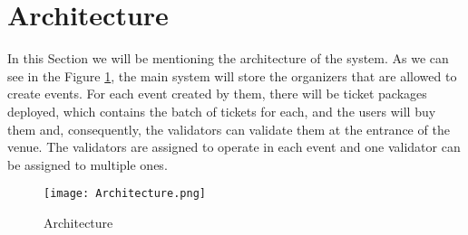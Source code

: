 \section{Architecture}
\label{sec:architecture}

In this Section we will be mentioning the architecture of the system. As we can
see in the Figure \ref{fig:architecture}, the main system will store the
organizers that are allowed to create events. For each event created by them,
there will be ticket packages deployed, which contains the batch of tickets for
each, and the users will buy them and, consequently, the validators can
validate them at the entrance of the venue. The validators are assigned to
operate in each event and one validator can be assigned to multiple ones.

\begin{figure}[H]
    \texttt{[image: Architecture.png]}
    \centering
    \caption{Architecture}
    \label{fig:architecture}
\end{figure}
